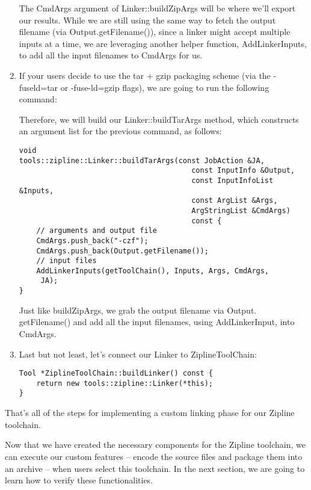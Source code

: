 \begin{enumerate}
The CmdArgs argument of Linker::buildZipArgs will be where we'll export our results. While we are still using the same way to fetch the output filename (via Output.getFilename()), since a linker might accept multiple inputs at a time, we are leveraging another helper function, AddLinkerInputs, to add all the input filenames to CmdArgs for us.

\item If your users decide to use the tar + gzip packaging scheme (via the -fuseld=tar or -fuse-ld=gzip flags), we are going to run the following command:


Therefore, we will build our Linker::buildTarArgs method, which constructs an argument list for the previous command, as follows:

\begin{lstlisting}[style=styleCXX]
void
tools::zipline::Linker::buildTarArgs(const JobAction &JA,
										const InputInfo &Output,
										const InputInfoList &Inputs,
										const ArgList &Args,
										ArgStringList &CmdArgs)
										const {
	// arguments and output file
	CmdArgs.push_back("-czf");
	CmdArgs.push_back(Output.getFilename());
	// input files
	AddLinkerInputs(getToolChain(), Inputs, Args, CmdArgs,
	 JA);
}
\end{lstlisting}

Just like buildZipArgs, we grab the output filename via Output. getFilename() and add all the input filenames, using AddLinkerInput, into CmdArgs.

\item Last but not least, let's connect our Linker to ZiplineToolChain:

\begin{lstlisting}[style=styleCXX]
Tool *ZiplineToolChain::buildLinker() const {
	return new tools::zipline::Linker(*this);
}
\end{lstlisting}

\end{enumerate}

That's all of the steps for implementing a custom linking phase for our Zipline toolchain.

Now that we have created the necessary components for the Zipline toolchain, we can execute our custom features – encode the source files and package them into an archive – when users select this toolchain. In the next section, we are going to learn how to verify these functionalities.


